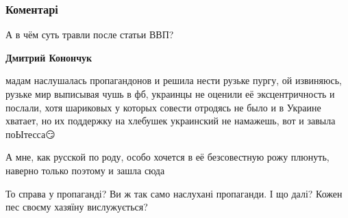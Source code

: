  
 
 
 
 
\subsubsection{Коментарі}

\begin{itemize}
 
А в чём суть травли после статьи ВВП?

\begin{itemize}
 
\textbf{Дмитрий Конончук} 

мадам наслушалась пропагандонов и решила нести рузьке пургу, ой извиняюсь,
рузьке мир выписывая чушь в фб, украинцы не оценили её эксцентричность и
послали, хотя шариковых у которых совести отродясь не было и в Украине хватает,
но их поддержку на хлебушек украинский не намажешь, вот и завыла поЫтесса😏

А мне, как русской по роду, особо хочется в её безсовестную рожу плюнуть, наверно только поэтому и зашла сюда

 
То справа у пропаганді?
Ви ж так само наслухані пропаганди. І що далі?
Кожен пес своєму хазяїну вислужується?

 

\end{itemize}
\end{itemize}
